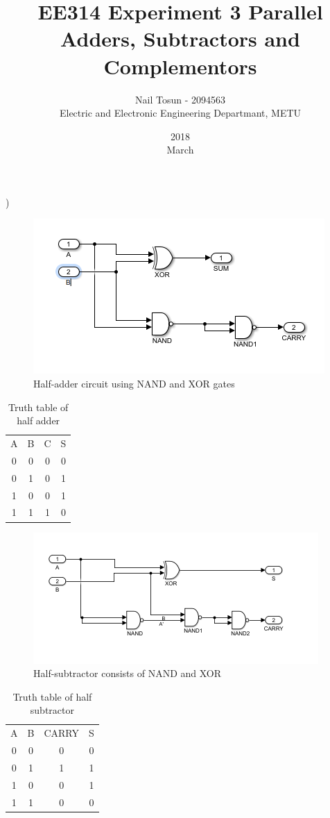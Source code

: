 \documentclass[11pt]{report}
\title{EE314 Experiment 3 Parallel Adders, Subtractors and Complementors}
\date{2018\\ March}
\author{Nail Tosun - 2094563\\ Electric and Electronic Engineering Departmant, METU}
\begin{document}
)
\begin{figure}[H]
  \includegraphics[width=\linewidth]{halfadder}
  \caption{Half-adder circuit using NAND and XOR gates}
  \label{fig:zero}
\end{figure} 

\begin{table}[H]
\centering
\caption{Truth table of half adder}
\label{my-label}
\begin{tabular}{cccc}
A & B & C & S \\
0 & 0 & 0 & 0 \\
0 & 1 & 0 & 1 \\
1 & 0 & 0 & 1 \\
1 & 1 & 1 & 0
\end{tabular}
\end{table}

\begin{figure}[H]
  \includegraphics[width=\linewidth]{halfsub}
  \caption{Half-subtractor consists of NAND and XOR}
  \label{fig:zero}
\end{figure}

\begin{table}[H]
\centering
\caption{Truth table of half subtractor}
\label{my-label}
\begin{tabular}{cccc}
A & B & CARRY & S \\
0 & 0 & 0 & 0 \\
0 & 1 & 1 & 1 \\
1 & 0 & 0 & 1 \\
1 & 1 & 0 & 0
\end{tabular}
\end{table}
\end{document}
